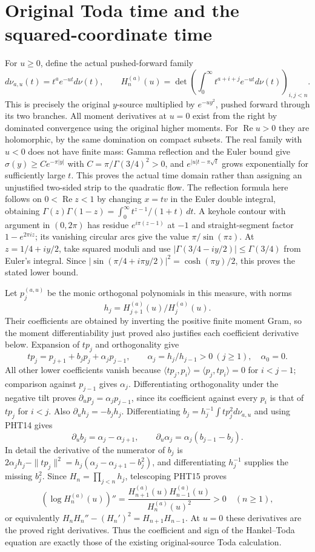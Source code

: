\documentclass[11pt,a4paper]{article}
\begin{document}
\section{Original Toda time and the squared-coordinate time}

For $u\geq0$, define the actual pushed-forward family
\[
 d\nu_{a,u}(t)=t^a e^{-ut}d\nu(t),\qquad
 H_n^{(a)}(u)=\det\left(\int_0^\infty
                    t^{a+i+j}e^{-ut}d\nu(t)\right)_{i,j<n}.
\tag{PHT13}
\]
This is precisely the original $y$-source multiplied by
$e^{-u y^2}$, pushed forward through its two branches.
All moment derivatives at $u=0$ exist from the right by
dominated convergence using the original higher moments.
For $\operatorname{Re}u>0$ they are holomorphic, by the same
domination on compact subsets. The real family with $u<0$
does not have finite mass: Gamma reflection and the Euler
bound give $\sigma(y)\geq C e^{-\pi|y|}$ with
$C=\pi/\Gamma(3/4)^2>0$, and
$e^{|u|t-\pi\sqrt t}$ grows exponentially for sufficiently
large $t$. This proves the actual time domain rather than
assigning an unjustified two-sided strip to the quadratic flow.
The reflection formula here follows on $0<\operatorname{Re}z<1$
by changing $x=tv$ in the Euler double integral, obtaining
$\Gamma(z)\Gamma(1-z)=\int_0^\infty t^{z-1}/(1+t)\,dt$.
A keyhole contour with argument in $(0,2\pi)$ has residue
$e^{i\pi(z-1)}$ at $-1$ and straight-segment factor
$1-e^{2\pi iz}$; its vanishing circular arcs give the value
$\pi/\sin(\pi z)$. At $z=1/4+iy/2$, take squared moduli
and use $|\Gamma(3/4-iy/2)|\leq\Gamma(3/4)$ from Euler's
integral. Since $|\sin(\pi/4+i\pi y/2)|^2
=\cosh(\pi y)/2$, this proves the stated lower bound.

Let $p_j^{(a,u)}$ be the monic orthogonal polynomials in this
measure, with norms
\[h_j=H_{j+1}^{(a)}(u)/H_j^{(a)}(u).\]
Their coefficients are obtained by inverting the positive
finite moment Gram, so the moment differentiability just
proved also justifies each coefficient derivative below.
Expansion of $tp_j$ and orthogonality give
\[
 tp_j=p_{j+1}+b_jp_j+\alpha_jp_{j-1},\qquad
 \alpha_j=h_j/h_{j-1}>0\ (j\geq1),\quad\alpha_0=0.
\tag{PHT14}
\]
All other lower coefficients vanish because
$\langle tp_j,p_i\rangle=\langle p_j,tp_i\rangle=0$
for $i<j-1$; comparison against $p_{j-1}$ gives $\alpha_j$.
Differentiating orthogonality under the negative tilt proves
$\partial_u p_j=\alpha_jp_{j-1}$, since its coefficient
against every $p_i$ is that of $tp_j$ for $i<j$.
Also $\partial_u h_j=-b_jh_j$. Differentiating
$b_j=h_j^{-1}\int t p_j^2d\nu_{a,u}$ and using PHT14 gives
\[
 \partial_u b_j=\alpha_j-\alpha_{j+1},\qquad
 \partial_u\alpha_j=\alpha_j(b_{j-1}-b_j).
\tag{PHT15}
\]
In detail the derivative of the numerator of $b_j$ is
$2\alpha_jh_j-\|tp_j\|^2
=h_j(\alpha_j-\alpha_{j+1}-b_j^2)$, and differentiating
$h_j^{-1}$ supplies the missing $b_j^2$.
Since $H_n=\prod_{j<n}h_j$, telescoping PHT15 proves
\[
 (\log H_n^{(a)}(u))''
  =\frac{H_{n+1}^{(a)}(u)H_{n-1}^{(a)}(u)}{H_n^{(a)}(u)^2}>0
  \quad(n\geq1),
\tag{PHT16}
\]
or equivalently
$H_nH_n''-(H_n')^2=H_{n+1}H_{n-1}$.
At $u=0$ these derivatives are the proved right derivatives.
Thus the coefficient and sign of the Hankel--Toda equation
are exactly those of the existing original-source Toda calculation.
\end{document}
